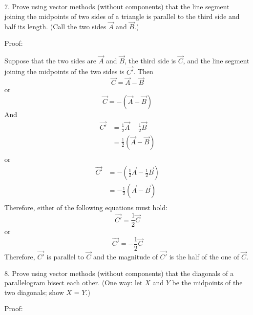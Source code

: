 \documentclass{article}
\begin{document}
7. Prove using vector methods (without components) that the line segment
joining the midpoints of two sides of a triangle is parallel to the third side
and half its length. (Call the two sides $\vec{A}$ and $\vec{B}$.)

Proof:

Suppose that the two sides are $\vec{A}$ and $\vec{B}$, the third side is 
$\vec{C}$, and the line segment joining the midpoints of the two sides is
$\vec{C'}$. Then
\[
  \vec{C} = \vec{A} - \vec{B}
\]
or
\[
  \vec{C} = -(\vec{A} - \vec{B})
\]
And
\[
  \begin{split}
    \vec{C'} &= \frac{1}{2}\vec{A} - \frac{1}{2}\vec{B} \\
             &= \frac{1}{2}(\vec{A} - \vec{B}) \\
  \end{split}
\]
or
\[
  \begin{split}
    \vec{C'} &= -(\frac{1}{2}\vec{A} - \frac{1}{2}\vec{B}) \\
             &= -\frac{1}{2}(\vec{A} - \vec{B}) \\
  \end{split}
\]
Therefore, either of the following equations must hold:
\[
  \vec{C'} = \frac{1}{2}\vec{C}
\]
or
\[
  \vec{C'} = -\frac{1}{2}\vec{C}
\]
Therefore, $\vec{C'}$ is parallel to $\vec{C}$ and the magnitude of $\vec{C'}$ 
is the half of the one of $\vec{C}$.

8. Prove using vector methods (without components) that the diagonals of a
parallelogram bisect each other. (One way: let $X$ and $Y$ be the midpoints of
the two diagonals; show $X$ = $Y$.)

Proof:

\end{document}
